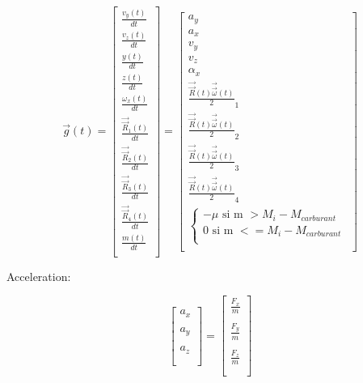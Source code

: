 \documentclass{article}
\begin{document}
\begin{equation}
\vec{g}(t) = 
\begin{bmatrix}
    \frac{v_y(t)}{dt} \\
    \frac{v_z(t)}{dt} \\
    \frac{y(t)}{dt} \\
    \frac{z(t)}{dt} \\
    \frac{\omega_x(t)}{dt} \\
    \frac{\vec{\vec{R}}_1(t)}{dt} \\
    \frac{\vec{\vec{R}}_2(t)}{dt} \\
    \frac{\vec{\vec{R}}_3(t)}{dt} \\
    \frac{\vec{\vec{R}}_4(t)}{dt} \\
    \frac{m(t)}{dt} \\
\end{bmatrix}
=
\begin{bmatrix}
    a_y \\
    a_x \\
    v_y \\
    v_z \\
    \alpha_x \\
    \frac{\vec{\vec{R}}(t)\vec{\vec{\omega}}(t)}{2}_1 \\
    \frac{\vec{\vec{R}}(t)\vec{\vec{\omega}}(t)}{2}_2 \\
    \frac{\vec{\vec{R}}(t)\vec{\vec{\omega}}(t)}{2}_3 \\
    \frac{\vec{\vec{R}}(t)\vec{\vec{\omega}}(t)}{2}_4 \\
    \begin{cases}
        -\mu \text{ si m } > M_i - M_{carburant}\\
        0 \text{ si m } <= M_i - M_{carburant}\\
    \end{cases} \\
\end{bmatrix}
\end{equation}

Acceleration:

\begin{equation}
    \begin{bmatrix}
        a_x \\ \\
        a_y \\ \\
        a_z \\ \\
    \end{bmatrix}
=
\begin{bmatrix}
    \frac{F_x}{m} \\ \\
    \frac{F_y}{m} \\ \\
    \frac{F_z}{m} \\ \\
\end{bmatrix}
\end{equation}
\end{document}
